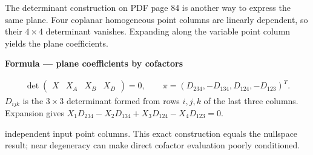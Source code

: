\documentclass[letterpaper,11pt,english,openany,oneside]{jupyterBook}
\begin{document}
\sphinxAtStartPar
The determinant construction on PDF page 84 is another way to express the same plane. Four coplanar homogeneous point columns are linearly dependent, so their \(4\times4\) determinant vanishes. Expanding along the variable point column yields the plane coefficients.

\begin{TextbookBox}
\textbf{Formula — plane coefficients by cofactors}\par\smallskip
\begin{equation}\label{equation:lectures/lecture01/planes-lines:eq-lec01-cofactor}
\begin{split}\det\begin{pmatrix}X&X_A&X_B&X_D\end{pmatrix}=0,
\qquad \pi=(D_{234},-D_{134},D_{124},-D_{123})^T.\end{split}
\end{equation}
\sphinxAtStartPar
\(D_{ijk}\) is the \(3\times3\) determinant formed from rows \(i,j,k\) of the last three columns. Expansion gives \(X_1D_{234}-X_2D_{134}+X_3D_{124}-X_4D_{123}=0\).

\sphinxAtStartPar
{} independent input point columns. This exact construction equals the nullspace result; near degeneracy can make direct cofactor evaluation poorly conditioned.

\end{TextbookBox}
\end{document}
